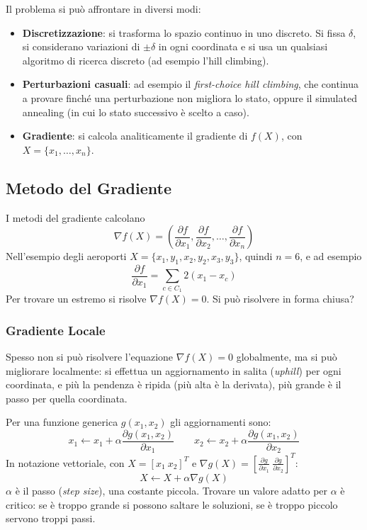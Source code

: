 \documentclass[a4paper, 11pt, oneside]{book}
\theoremstyle{definition}
\begin{document}
    Il problema si pu\`o affrontare in diversi modi:
    \begin{itemize}
        \item \textbf{Discretizzazione}: si trasforma lo spazio continuo in uno discreto. Si
            fissa $\delta$, si considerano variazioni di $\pm\delta$ in ogni coordinata e si
            usa un qualsiasi algoritmo di ricerca discreto (ad esempio l'hill climbing).
        \item \textbf{Perturbazioni casuali}: ad esempio il \emph{first-choice hill
            climbing}, che continua a provare finch\'e una perturbazione non migliora lo
            stato, oppure il simulated annealing (in cui lo stato successivo \`e scelto a
            caso).
        \item \textbf{Gradiente}: si calcola analiticamente il gradiente di $f(X)$, con
            $X = \{x_1, \dots, x_n\}$.
    \end{itemize}

    \subsection{Metodo del Gradiente}
    I metodi del gradiente calcolano
    \[
        \nabla f(X) = \left( \frac{\partial f}{\partial x_1}, \frac{\partial f}{\partial x_2},
        \dots, \frac{\partial f}{\partial x_n} \right)
    \]
    Nell'esempio degli aeroporti $X = \{x_1, y_1, x_2, y_2, x_3, y_3\}$, quindi $n = 6$, e
    ad esempio
    \[
        \frac{\partial f}{\partial x_1} = \sum_{c \in C_1} 2 (x_1 - x_c)
    \]
    Per trovare un estremo si risolve $\nabla f(X) = 0$. Si pu\`o risolvere in forma chiusa?

    \subsubsection*{Gradiente Locale}
    Spesso non si pu\`o risolvere l'equazione $\nabla f(X) = 0$ globalmente, ma si pu\`o
    migliorare localmente: si effettua un aggiornamento in salita (\emph{uphill}) per ogni
    coordinata, e pi\`u la pendenza \`e ripida (pi\`u alta \`e la derivata), pi\`u grande \`e il
    passo per quella coordinata.

    Per una funzione generica $g(x_1, x_2)$ gli aggiornamenti sono:
    \[
        x_1 \leftarrow x_1 + \alpha \frac{\partial g(x_1, x_2)}{\partial x_1}
        \qquad
        x_2 \leftarrow x_2 + \alpha \frac{\partial g(x_1, x_2)}{\partial x_2}
    \]
    In notazione vettoriale, con $X = [x_1 \ x_2]^T$ e
    $\nabla g(X) = \left[ \frac{\partial g}{\partial x_1} \
    \frac{\partial g}{\partial x_2} \right]^T$:
    \[
        X \leftarrow X + \alpha \nabla g(X)
    \]
    $\alpha$ \`e il passo (\emph{step size}), una costante piccola. Trovare un valore adatto
    per $\alpha$ \`e critico: se \`e troppo grande si possono saltare le soluzioni, se \`e
    troppo piccolo servono troppi passi.
\end{document}
